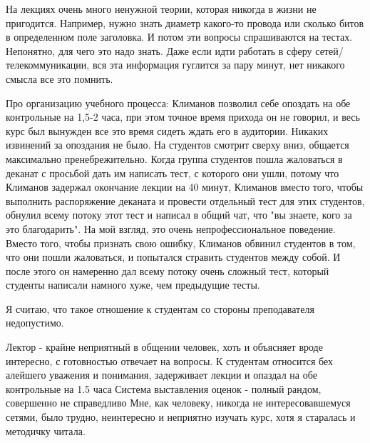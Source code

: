             \begin{commentbox} 
                На лекциях очень много ненужной теории, которая никогда в жизни не пригодится. Например, нужно знать диаметр какого-то провода или сколько битов в определенном поле заголовка. И потом эти вопросы спрашиваются на тестах. Непонятно, для чего это надо знать. Даже если идти работать в сферу сетей/ телекоммуникации, вся эта информация гуглится за пару минут, нет никакого смысла все это помнить.

                Про организацию учебного процесса: Климанов позволил себе опоздать на обе контрольные на 1,5-2 часа, при этом точное время прихода он не говорил, и весь курс был вынужден все это время сидеть ждать его в аудитории. Никаких извинений за опоздания не было. На студентов смотрит сверху вниз, общается максимально пренебрежительно. Когда группа студентов пошла жаловаться в деканат с просьбой дать им написать тест, с которого они ушли, потому что Климанов задержал окончание лекции на 40 минут, Климанов вместо того, чтобы выполнить распоряжение деканата и провести отдельный тест для этих студентов, обнулил всему потоку этот тест и написал в общий чат, что "вы знаете, кого за это благодарить". На мой взгляд, это очень непрофессиональное поведение. Вместо того, чтобы признать свою ошибку, Климанов обвинил студентов в том, что они пошли жаловаться, и попытался стравить студентов между собой. И после этого он намеренно дал всему потоку очень сложный тест, который студенты написали намного хуже, чем предыдущие тесты.

                Я считаю, что такое отношение к студентам со стороны преподавателя недопустимо. 
            \end{commentbox} 
        
            \begin{commentbox} 
                Лектор - крайне неприятный в общении человек, хоть и объясняет вроде интересно, с готовностью отвечает на вопросы.  К студентам относится бех алейшего уважения и понимания, задерживает лекции и опаздал на обе контрольные на 1.5 часа
                Система выставления оценок - полный рандом, совершенно не справедливо
                Мне, как человеку, никогда не интересовавшемуся сетями, было трудно, неинтересно и неприятно изучать курс, хотя я старалась и методичку читала. 
            \end{commentbox} 
        
